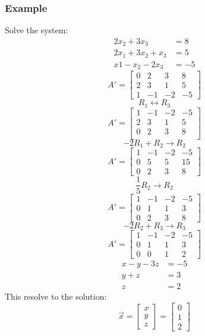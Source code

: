 \documentclass[letterpaper, 12pt]{math}
\begin{document}
\subsubsection*{Example}
Solve the system:
\begin{align*}
  2x_2+3x_3 &= 8 \\
  2x_1+3x_2+x_3 &= 5 \\
  x1-x_2-2x_3 &= -5
\end{align*}
\[ A' = \left[\begin{array}{ccc|c}
  0 & 2 & 3 & 8 \\
  2 & 3 & 1 & 5 \\
  1 & -1 & -2 & -5
\end{array}\right] \]
\[ R_1 \leftrightarrow R_3 \]
\[ A' = \left[\begin{array}{ccc|c}
  1 & -1 & -2 & -5 \\
  2 & 3 & 1 & 5 \\
  0 & 2 & 3 & 8 \\
\end{array}\right] \]
\[ -2R_1+R_2 \to R_2 \]
\[ A' = \left[\begin{array}{ccc|c}
  1 & -1 & -2 & -5 \\
  0 & 5 & 5 & 15 \\
  0 & 2 & 3 & 8
\end{array}\right] \]
\[ \frac{1}{5}R_2 \to R_2 \]
\[ A' = \left[\begin{array}{ccc|c}
  1 & -1 & -2 & -5 \\
  0 & 1 & 1 & 3 \\
  0 & 2 & 3 & 8
\end{array}\right] \]
\[ -2R_2+R_3 \to R_3 \]
\[ A' = \left[\begin{array}{ccc|c}
  1 & -1 & -2 & -5 \\
  0 & 1 & 1 & 3 \\
  0 & 0 & 1 & 2
\end{array}\right] \]
\begin{align*}
  x-y-3z &= -5 \\
  y+z &= 3 \\
  z &= 2
\end{align*}
This resolve to the solution:
\[ \vec{x} = \begin{bmatrix}x \\ y \\ z\end{bmatrix} = \begin{bmatrix}
  0 \\ 1 \\ 2
\end{bmatrix} \]
\end{document}
